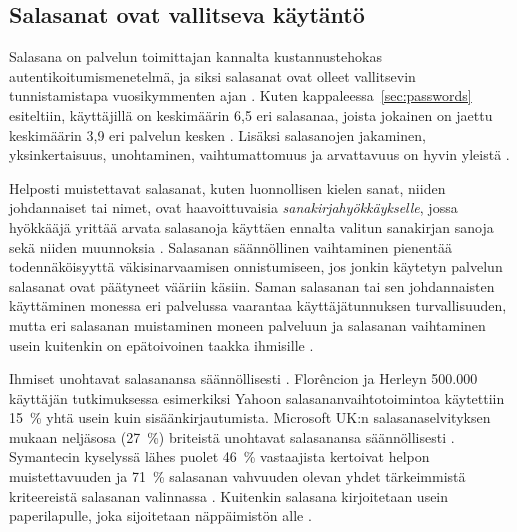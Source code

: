 \documentclass[english,gradu]{tktltiki}
\begin{document}

\subsection{Salasanat ovat vallitseva käytäntö} %
\label{sub:salasanat_ovat_vallitseva_käytäntö}
\label{sec:passwords_de_facto}

             Salasana on palvelun toimittajan kannalta kustannustehokas autentikoitumismenetelmä, ja siksi salasanat ovat olleet vallitsevin tunnistamistapa vuosikymmenten ajan \cite{pw_auth_system_perspective_08}. Kuten kappaleessa~\ref{sec:passwords} esiteltiin, käyttäjillä on keskimäärin 6,5 eri salasanaa, joista jokainen on jaettu keskimäärin 3,9 eri palvelun kesken \cite{study_of_passwords_07}. Lisäksi salasanojen jakaminen, yksinkertaisuus, unohtaminen, vaihtumattomuus ja arvattavuus on hyvin yleistä \cite{password_management_strategies_06, pw_auth_system_perspective_08, passpet_06}.

             Helposti muistettavat salasanat, kuten luonnollisen kielen sanat, niiden johdannaiset tai nimet, ovat haavoittuvaisia \emph{sanakirjahyökkäykselle}, jossa hyökkääjä yrittää arvata salasanoja käyttäen ennalta valitun sanakirjan sanoja sekä niiden muunnoksia \cite{users_are_not_the_enemy_99, passpet_06}. Salasanan säännöllinen vaihtaminen pienentää todennäköisyyttä väkisinarvaamisen onnistumiseen, jos jonkin käytetyn palvelun salasanat ovat päätyneet vääriin käsiin. Saman salasanan tai sen johdannaisten käyttäminen monessa eri palvelussa vaarantaa käyttäjätunnuksen turvallisuuden, mutta eri salasanan muistaminen moneen palveluun ja salasanan vaihtaminen usein kuitenkin on epätoivoinen taakka ihmisille \cite{password_management_strategies_06, passpet_06, pw_auth_system_perspective_08, users_are_not_the_enemy_99}.

             Ihmiset unohtavat salasanansa säännöllisesti \cite{ponemon_pw_survey_06, password_management_strategies_06}. Florêncion ja Herleyn 500.000 käyttäjän tutkimuksessa \cite{study_of_passwords_07} esimerkiksi Yahoon salasananvaihtotoimintoa käytettiin 15~\% yhtä usein kuin sisäänkirjautumista. Microsoft UK:n salasanaselvityksen mukaan neljäsosa (27~\%) briteistä unohtavat salasanansa säännöllisesti \cite{microsoft_pw_survey_04}. Symantecin kyselyssä lähes puolet 46~\% vastaajista kertoivat helpon muistettavuuden ja 71~\% salasanan vahvuuden olevan yhdet tärkeimmistä kriteereistä salasanan valinnassa \cite{symantec_pw_survey_10}. Kuitenkin salasana kirjoitetaan usein paperilapulle, joka sijoitetaan näppäimistön alle \cite{pw_auth_system_perspective_08}.
\end{document}
